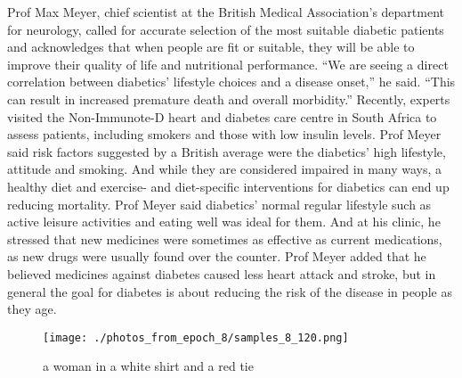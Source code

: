 \documentclass{article}%
\begin{document}
Prof Max Meyer, chief scientist at the British Medical Association’s department for neurology, called for accurate selection of the most suitable diabetic patients and acknowledges that when people are fit or suitable, they will be able to improve their quality of life and nutritional performance.\newline%
“We are seeing a direct correlation between diabetics’ lifestyle choices and a disease onset,” he said.\newline%
“This can result in increased premature death and overall morbidity.”\newline%
Recently, experts visited the Non{-}Immunote{-}D heart and diabetes care centre in South Africa to assess patients, including smokers and those with low insulin levels.\newline%
Prof Meyer said risk factors suggested by a British average were the diabetics’ high lifestyle, attitude and smoking.\newline%
And while they are considered impaired in many ways, a healthy diet and exercise{-} and diet{-}specific interventions for diabetics can end up reducing mortality.\newline%
Prof Meyer said diabetics’ normal regular lifestyle such as active leisure activities and eating well was ideal for them.\newline%
And at his clinic, he stressed that new medicines were sometimes as effective as current medications, as new drugs were usually found over the counter.\newline%
Prof Meyer added that he believed medicines against diabetes caused less heart attack and stroke, but in general the goal for diabetes is about reducing the risk of the disease in people as they age.\newline%

%


\begin{figure}[h!]%
\centering%
\texttt{[image: ./photos\_from\_epoch\_8/samples\_8\_120.png]}%
\caption{a woman in a white shirt and a red tie}%
\end{figure}

%
\end{document}
